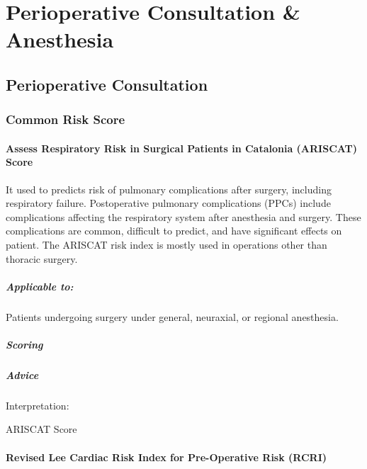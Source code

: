 \documentclass[
  letterpaper,
  DIV=11,
  numbers=noendperiod]{scrreprt}
\let\oldparagraph\paragraph
\renewcommand{\paragraph}[1]{\oldparagraph{#1}\mbox{}}
\begin{document}
\chapter{Perioperative Consultation \&
Anesthesia}\label{perioperative-consultation-anesthesia}

\section{Perioperative Consultation}\label{perioperative-consultation}

\subsection{Common Risk Score}\label{common-risk-score}

\subsubsection{Assess Respiratory Risk in Surgical Patients in Catalonia
(ARISCAT)
Score}\label{assess-respiratory-risk-in-surgical-patients-in-catalonia-ariscat-score}

It used to predicts risk of pulmonary complications after surgery,
including respiratory failure. Postoperative pulmonary complications
(PPCs) include complications affecting the respiratory system after
anesthesia and surgery. These complications are common, difficult to
predict, and have significant effects on patient. The ARISCAT risk index
is mostly used in operations other than thoracic surgery.

\paragraph{Applicable to:}\label{applicable-to}

Patients undergoing surgery under general, neuraxial, or regional
anesthesia.

\paragraph{Scoring}\label{scoring}

\paragraph{Advice}\label{advice}

Interpretation:

ARISCAT Score

\subsubsection{Revised Lee Cardiac Risk Index for Pre-Operative Risk
(RCRI)}\label{revised-lee-cardiac-risk-index-for-pre-operative-risk-rcri}
\end{document}
